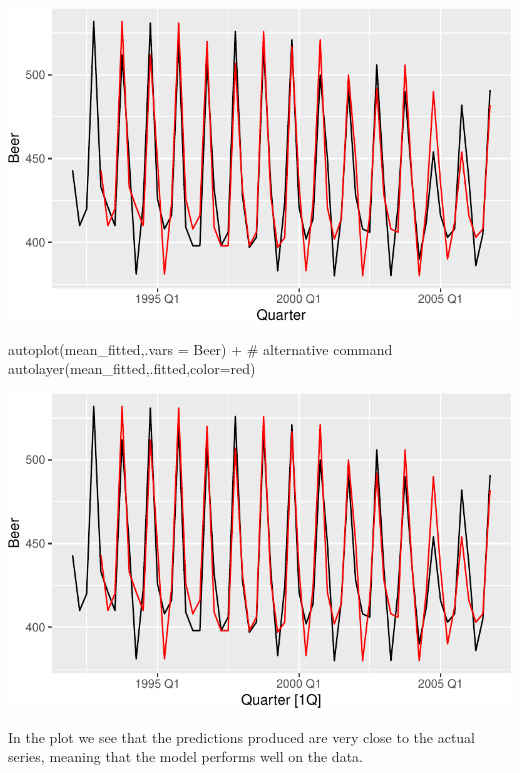 \documentclass[
  letterpaper,
  DIV=11,
  numbers=noendperiod]{scrartcl}
\newenvironment{Shaded}{\begin{snugshade}}{\end{snugshade}}
\newcommand{\AttributeTok}[1]{\textcolor[rgb]{0.40,0.45,0.13}{#1}}
\newcommand{\CommentTok}[1]{\textcolor[rgb]{0.37,0.37,0.37}{#1}}
\newcommand{\FunctionTok}[1]{\textcolor[rgb]{0.28,0.35,0.67}{#1}}
\newcommand{\NormalTok}[1]{\textcolor[rgb]{0.00,0.23,0.31}{#1}}
\newcommand{\SpecialCharTok}[1]{\textcolor[rgb]{0.37,0.37,0.37}{#1}}
\newcommand{\StringTok}[1]{\textcolor[rgb]{0.13,0.47,0.30}{#1}}
\begin{document}
\begin{center}
\includegraphics{chapter5_review_files/figure-pdf/unnamed-chunk-27-1.pdf}
\end{center}

\begin{Shaded}
\begin{Highlighting}[]
\FunctionTok{autoplot}\NormalTok{(mean\_fitted,}\AttributeTok{.vars =}\NormalTok{ Beer) }\SpecialCharTok{+} \CommentTok{\# alternative command}
  \FunctionTok{autolayer}\NormalTok{(mean\_fitted,.fitted,}\AttributeTok{color=}\StringTok{\textquotesingle{}red\textquotesingle{}}\NormalTok{)}
\end{Highlighting}
\end{Shaded}

\begin{center}
\includegraphics{chapter5_review_files/figure-pdf/unnamed-chunk-27-2.pdf}
\end{center}

In the plot we see that the predictions produced are very close to the
actual series, meaning that the model performs well on the data.
\end{document}
